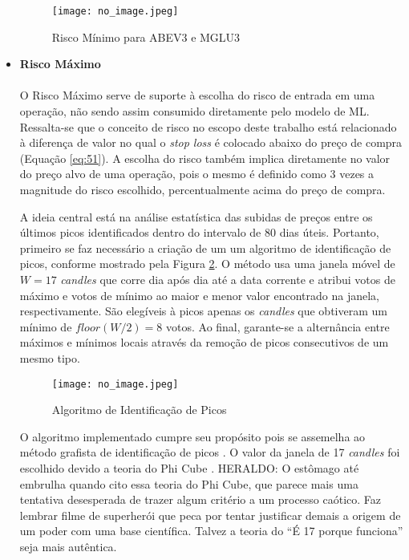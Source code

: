 \begin{itemize}
    \begin{figure}[h]
        \texttt{[image: no\_image.jpeg]}
        \centering
        \caption{Risco Mínimo para ABEV3 e MGLU3}
        \label{fig:105}
    \end{figure}

    \item \textbf{Risco Máximo} \\ \\
    O Risco Máximo serve de suporte à escolha do risco de entrada em uma operação, não sendo assim consumido diretamente pelo modelo de ML. Ressalta-se que o conceito de risco no escopo deste trabalho está relacionado à diferença de valor no qual o \textit{stop loss} é colocado abaixo do preço de compra (Equação \ref{eq:51}). A escolha do risco também implica diretamente no valor do preço alvo de uma operação, pois o mesmo é definido como 3 vezes a magnitude do risco escolhido, percentualmente acima do preço de compra.

    A ideia central está na análise estatística das subidas de preços entre os últimos picos identificados dentro do intervalo de 80 dias úteis. Portanto, primeiro se faz necessário a criação de um um algoritmo de identificação de picos, conforme mostrado pela Figura \ref{fig:106}. O método usa uma janela móvel de \begin{math} W = 17 \end{math} \textit{candles} que corre dia após dia até a data corrente e atribui votos de máximo e votos de mínimo ao maior e menor valor encontrado na janela, respectivamente. São elegíveis à picos apenas os \textit{candles} que obtiveram um mínimo de \begin{math}  floor(W / 2) = 8 \end{math} votos. Ao final, garante-se a alternância entre máximos e mínimos locais através da remoção de picos consecutivos de um mesmo tipo.

    \begin{figure}[h]
        \texttt{[image: no\_image.jpeg]}
        \centering
        \caption{Algoritmo de Identificação de Picos}
        \label{fig:106}
    \end{figure}

    O algoritmo implementado cumpre seu propósito pois se assemelha ao método grafista de identificação de picos \cite{moraes2007se}. O valor da janela de 17 \textit{candles} foi escolhido devido a teoria do Phi Cube \cite{moraes2007se}. \color{red} HERALDO: O estômago até embrulha quando cito essa teoria do Phi Cube, que parece mais uma tentativa desesperada de trazer algum critério a um processo caótico. Faz lembrar filme de superherói que peca por tentar justificar demais a origem de um poder com uma base científica. Talvez a teoria do ``É 17 porque funciona'' seja mais autêntica. 


\end{itemize}
